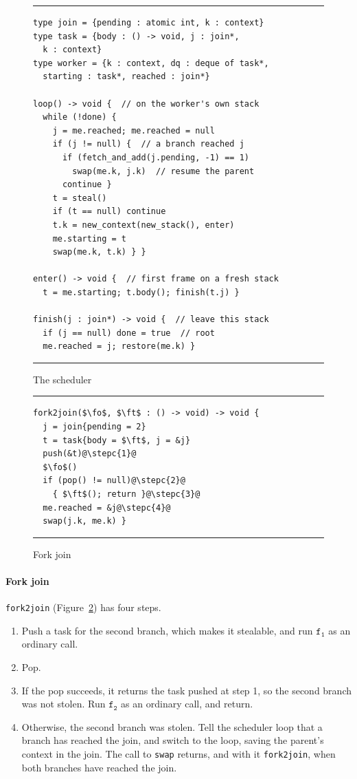 \documentclass[sigplan,nonacm]{acmart}
\newcommand{\fo}{\mathtt{f_1}}
\newcommand{\ft}{\mathtt{f_2}}
\newcommand{\stepc}[1]{\hfill{\rmfamily\slshape // (#1)}}
\begin{document}
\begin{figure}
\hrule
\begin{lstlisting}
type join = {pending : atomic int, k : context}
type task = {body : () -> void, j : join*,
  k : context}
type worker = {k : context, dq : deque of task*,
  starting : task*, reached : join*}

loop() -> void {  // on the worker's own stack
  while (!done) {
    j = me.reached; me.reached = null
    if (j != null) {  // a branch reached j
      if (fetch_and_add(j.pending, -1) == 1)
        swap(me.k, j.k)  // resume the parent
      continue }
    t = steal()
    if (t == null) continue
    t.k = new_context(new_stack(), enter)
    me.starting = t
    swap(me.k, t.k) } }

enter() -> void {  // first frame on a fresh stack
  t = me.starting; t.body(); finish(t.j) }

finish(j : join*) -> void {  // leave this stack
  if (j == null) done = true  // root
  me.reached = j; restore(me.k) }
\end{lstlisting}
\hrule
\caption{The scheduler}
\label{fig:scheduler}
\end{figure}

\begin{figure}
\hrule
\begin{lstlisting}[escapechar=@]
fork2join($\fo$, $\ft$ : () -> void) -> void {
  j = join{pending = 2}
  t = task{body = $\ft$, j = &j}
  push(&t)@\stepc{1}@
  $\fo$()
  if (pop() != null)@\stepc{2}@
    { $\ft$(); return }@\stepc{3}@
  me.reached = &j@\stepc{4}@
  swap(j.k, me.k) }
\end{lstlisting}
\hrule
\caption{Fork join}
\label{fig:fork2join}
\end{figure}

\paragraph{Fork join}
%
\lstinline|fork2join| (Figure~\ref{fig:fork2join}) has four steps.
%
\begin{enumerate}[leftmargin=*,label=(\arabic*)]
\item Push a task for the second branch, which makes it stealable, and
  run $\fo$ as an ordinary call.
\item Pop.
\item If the pop succeeds, it returns the task pushed at step 1, so the
  second branch was not stolen.
  Run $\ft$ as an ordinary call, and return.
\item Otherwise, the second branch was stolen.
  Tell the scheduler loop that a branch has reached the join, and
  switch to the loop, saving the parent's context in the join.
  The call to \lstinline|swap| returns, and with it
  \lstinline|fork2join|, when both branches have reached the join.
\end{enumerate}
\end{document}
